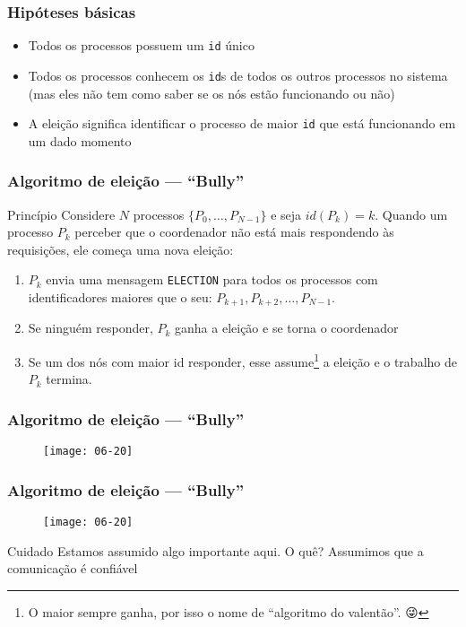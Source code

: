 \documentclass[Ligatures=TeX,table,brazil,svgnames,usetotalslideindicator,compress,10pt]{beamer}
\begin{document}
\begin{frame}
  \frametitle{Hipóteses básicas}
  \begin{itemize}
  \item Todos os processos possuem um \texttt{id} único
  \item Todos os processos conhecem os \texttt{id}s de todos os outros processos no sistema (mas eles não tem como saber se os nós estão funcionando ou não)
  \item A eleição significa identificar o processo de maior \texttt{id} que está funcionando em um dado momento
  \end{itemize}
\end{frame}

\begin{frame}
  \frametitle{Algoritmo de eleição --- ``Bully''}

  \begin{block}{Princípio}
    Considere $N$ processos $\{P_0, \ldots, P_{N-1}\}$ e seja $id(P_k)=k$. Quando um processo $P_k$ perceber que o coordenador não está mais respondendo às requisições, ele começa uma nova eleição:
    \begin{enumerate}
    \item $P_k$ envia uma mensagem \texttt{ELECTION} para todos os processos com identificadores maiores que o seu: $P_{k+1}, P_{k+2}, \ldots, P_{N-1}$.
    \item Se ninguém responder, $P_k$ ganha a eleição e se torna o coordenador
    \item Se um dos nós com maior id responder, esse assume\footnote{O maior sempre ganha, por isso o nome de ``algoritmo do valentão''. 😜} a eleição e o trabalho de $P_k$ termina.
    \end{enumerate}
  \end{block}

\end{frame}

\begin{frame}
  \frametitle{Algoritmo de eleição --- ``Bully''}

  \begin{figure}
    \centering
    \texttt{[image: 06-20]}
  \end{figure}

\end{frame}

\begin{frame}
  \frametitle{Algoritmo de eleição --- ``Bully''}
  \begin{figure}
    \centering
    \texttt{[image: 06-20]}
  \end{figure}

  \begin{alertblock}{Cuidado}
    Estamos assumido algo importante aqui. O quê? \pause \newline
    Assumimos que a comunicação é \alert{confiável}
  \end{alertblock}

\end{frame}
\end{document}
